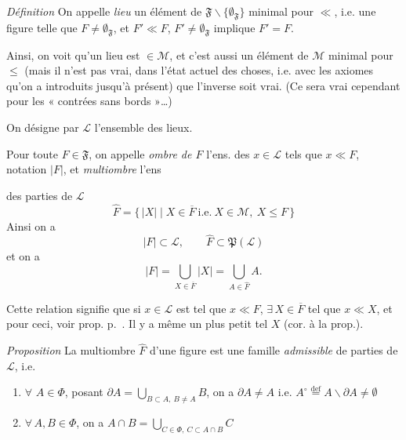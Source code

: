 \documentclass[11pt,a4paper]{article}
\begin{document}
\emph{Définition} \quad On appelle \emph{lieu}  un élément de $\mathfrak{F} \smallsetminus \lbrace\emptyset_{\mathfrak{F}}\rbrace$ minimal pour $\ll$, i.e. une figure  telle que  $F \neq \emptyset_{\mathfrak{F}}$, et $F' \ll F$, $F' \neq \emptyset_{\mathfrak{F}}$ implique $F' = F$.

Ainsi, on voit qu'un lieu est \ill{} $\in \mathcal{M}$, et c'est aussi un élément de $\mathcal{M}$ minimal pour $\leq$ (mais il n'est pas vrai, dans l'état actuel des choses, i.e. avec les axiomes qu'on a introduits jusqu'à présent) que l'inverse soit vrai. (Ce sera vrai cependant pour les « contrées sans bords »\ldots)

On désigne par $\mathcal{L}$ l'ensemble des lieux.

 Pour toute $F \in \mathfrak{F}$, on appelle \emph{ombre de $F$} l'ens. des $x \in \mathcal{L}$ tels que $x \ll F$, notation $|F|$, et \emph{multiombre} l'ens

des parties \struck{\ill{}} de $\mathcal{L}$
\[
  \widehat{F} = \lbrace\, |X| \mid X \in \overline{F} \ \text{i.e.}\ X \in \mathcal{M},\ X \leq F \,\rbrace
\]
Ainsi on a
\[
  |F| \subset \mathcal{L} , \qquad \widehat{F} \subset \mathfrak{P}(\mathcal{L})
\]
et on a
\[
  |F| = \bigcup_{X \in \overline{F}} |X| = \bigcup_{A \in \widehat{F}} A .
\]

Cette relation signifie que si $x \in \mathcal{L}$ est tel que $x \ll F$, $\exists\, X \in \overline{F}$ tel que $x \ll X$, \struck{\ill{}} et pour ceci, voir prop. p.~. Il y a même un plus petit tel $X$ (cor. à la prop.).


\emph{Proposition} \quad La multiombre \add{$\Phi =$} $\widehat{F}$ d'une figure est une famille \emph{admissible} de parties de $\mathcal{L}$, i.e.
\begin{enumerate}
  \item[a)] $\forall$ \struck{\ill{}} $A \in \Phi$, posant $\partial A = \bigcup_{B \subset A,\ B \neq A} B$, on a $\partial A \neq A$ i.e. $A^{\circ} \overset{\mathrm{def}}{=} A \smallsetminus \partial A \neq \emptyset$
  \item[b)] $\forall\, A, B \in \Phi$, on a $A \cap B = \bigcup_{C \in \Phi,\ C \subset A \cap B} C$
\end{enumerate}
\end{document}
